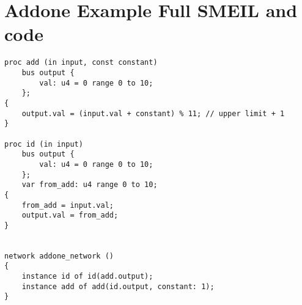 \chapter{Addone Example Full SMEIL and \cspm code}
\begin{verbatim}
proc add (in input, const constant)
    bus output {
        val: u4 = 0 range 0 to 10;
    };
{
    output.val = (input.val + constant) % 11; // upper limit + 1
}

proc id (in input)
    bus output {
        val: u4 = 0 range 0 to 10;
    };
    var from_add: u4 range 0 to 10;
{
    from_add = input.val;
    output.val = from_add;
}


network addone_network ()
{
    instance id of id(add.output);
    instance add of add(id.output, constant: 1);
}
\end{verbatim}

